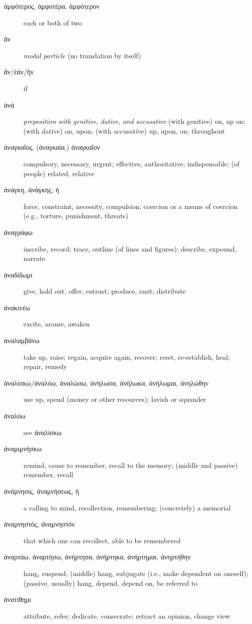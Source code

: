 \documentclass[12pt,letterpaper]{article}
\begin{document}
\begin{description}
    \item[\textgreek{ἀμφότερος, ἀμφοτέρα, ἀμφότερον}] \marginnote{*}each or both of two
    \item[\textgreek{ἄν}] \marginnote{*}\textit{modal particle} (no translation by itself)
    \item[\textgreek{ἄν/ἐάν/ἤν}] \marginnote{*}if
    \item[\textgreek{ἀνά}] \marginnote{*}\textit{preposition with genitive, dative, and accusative} (with genitive) on, up on; (with dative) on, upon; (with accusative) up, upon, on; throughout
    \item[\textgreek{ἀναγκαῖος, (ἀναγκαία,) ἀναγκαῖον}] compulsory, necessary, urgent; effective, authoritative; indispensable; (of people) related, relative
    \item[\textgreek{ἀνάγκη, ἀνάγκης, ἡ}] \marginnote{*}force, constraint, necessity, compulsion; coercion or a means of coercion (e.g., torture, punishment, threats)
    \item[\textgreek{ἀναγράφω}] inscribe, record; trace, outline (of lines and figures); describe, expound, narrate
    \item[\textgreek{ἀναδίδωμι}] give, hold out, offer, entrust; produce, emit; distribute
    \item[\textgreek{ἀνακινέω}] excite, arouse, awaken
    \item[\textgreek{ἀναλαμβάνω}] take up, raise; regain, acquire again, recover; reset, re-establish, heal; repair, remedy
    \item[\textgreek{ἀναλίσκω/ἀναλόω, ἀναλώσω, ἀνήλωσα, ἀνήλωκα, ἀνήλωμαι, ἀνηλώθην}] use up, spend (money or other resources); lavish or squander
    \item[\textgreek{ἀναλόω}] see \textgreek{ἀναλίσκω}
    \item[\textgreek{ἀναμιμνήσκω}] remind, cause to remember, recall to the memory; (middle and passive) remember, recall
    \item[\textgreek{ἀνάμνησις, ἀναμνήσεως, ἡ}] a calling to mind, recollection, remembering; (concretely) a memorial
    \item[\textgreek{ἀναμνηστός, ἀναμνηστόν}] that which one can recollect, able to be remembered
    \item[\textgreek{ἀναρτάω, ἀναρτήσω, ἀνήρτησα, ἀνήρτηκα, ἀνήρτημαι, ἀνηρτήθην}] hang, suspend; (middle) hang, subjugate (i.e., make dependent on oneself); (passive, usually) hang, depend, depend on, be referred to
    \item[\textgreek{ἀνατίθημι}] attribute, refer; dedicate, consecrate; retract an opinion, change view

\end{description}
\end{document}
